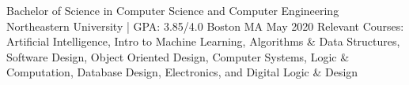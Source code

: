 

\begin{cventries}

  \cventry
    {Bachelor of Science in Computer Science and Computer Engineering} %
    {Northeastern University | GPA: 3.85/4.0} %
    {Boston MA} %
    {May 2020} %
    {
      Relevant Courses: Artificial Intelligence, Intro to Machine Learning, Algorithms \& Data Structures, Software Design, Object Oriented Design, Computer Systems, Logic \& Computation, Database Design, Electronics, and Digital Logic \& Design
    }

\end{cventries}
